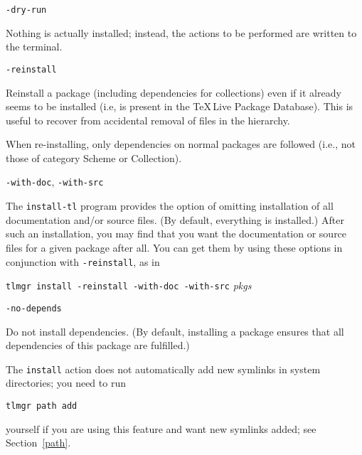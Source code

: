 \documentclass[11pt]{article}
\begin{document}
\begin{description}

\item\texttt{-dry-run}\par 

Nothing is actually installed; instead, the actions to be
performed are written to the terminal.

\item\texttt{-reinstall}\par 

Reinstall a package (including dependencies for collections)
even if it already seems to be installed (i.e, is present in
the \TeX\,Live Package Database). This is useful to recover
from accidental removal of files in the hierarchy.

When re-installing, only dependencies on normal packages are
followed (i.e., not those of category Scheme or Collection).

\item\texttt{-with-doc}, \texttt{-with-src}\par 

The \texttt{install-tl} program provides the option of
omitting installation of all documentation and/or source
files. (By default, everything is installed.) After such an
installation, you may find that you want the documentation
or source files for a given package after all. You can
get them by using these options in conjunction with
\texttt{-reinstall}, as in 
\begin{center} 
  \texttt{tlmgr install -reinstall -with-doc -with-src} \textsl{pkgs}
\end{center}

\item\texttt{-no-depends}\par 

Do not install dependencies. (By default, installing a
package ensures that all dependencies of this package are
fulfilled.)

\end{description}

\par\noindent 
The \texttt{install} action does not
automatically add new symlinks in system directories; you
need to run
\begin{center}
  \texttt{tlmgr path add} 
\end{center}
yourself if you are using this feature and want new symlinks
added; see Section~\ref{path}.

\clearpage
\end{document}
